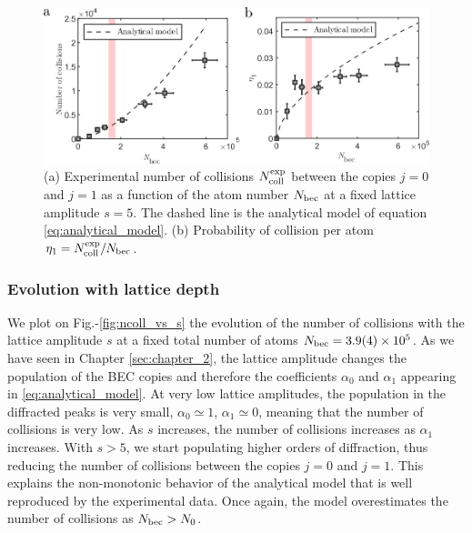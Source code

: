 \begin{figure}
    \centering
    \includegraphics[width=\textwidth]{Fig/Chapter3/ncoll_vs_atom_number.png}
    \caption{(a) Experimental number of collisions $N_{\rm{coll}}^{\rm{exp}}$ between the copies $j=0$ and $j=1$ as a function of the atom number $N_{\rm{bec}}$ at a fixed lattice amplitude $s=5$. The dashed line is the analytical model of equation \ref{eq:analytical_model}. (b) Probability of collision per atom $\eta_1=N_{\rm{coll}}^{\rm{exp}}/N_{\rm{bec}}$.}
    \label{fig:ncoll_vs_atom_number}
\end{figure}

\subsubsection{Evolution with lattice depth}

 We plot on Fig.-\ref{fig:ncoll_vs_s} the evolution of the number of collisions with the lattice amplitude $s$ at a fixed total number of atoms $N_{\rm{bec}} = 3.9(4) \times 10^5$. As we have seen in Chapter \ref{sec:chapter_2}, the lattice amplitude changes the population of the BEC copies and therefore the coefficients $\alpha_0$ and $\alpha_1$ appearing in \ref{eq:analytical_model}. At very low lattice amplitudes, the population in the diffracted peaks is very small, $\alpha_0 \simeq 1$, $\alpha_1 \simeq 0$, meaning that the number of collisions is very low. As $s$ increases, the number of collisions increases as $\alpha_1$ increases. With $s > 5$, we start populating higher orders of diffraction, thus reducing the number of collisions between the copies $j=0$ and $j=1$. This explains the non-monotonic behavior of the analytical model that is well reproduced by the experimental data. Once again, the model overestimates the number of collisions as $N_{\rm{bec}} > N_0$.
 
